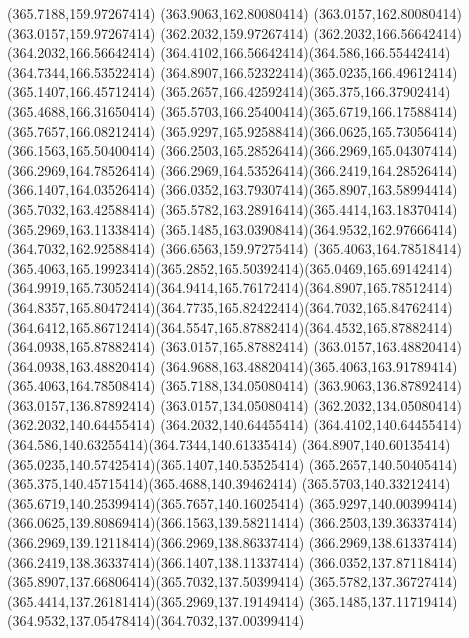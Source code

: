 {{	\closepath
	\moveto(365.7188,159.97267414)
	\lineto(363.9063,162.80080414)
	\lineto(363.0157,162.80080414)
	\lineto(363.0157,159.97267414)
	\lineto(362.2032,159.97267414)
	\lineto(362.2032,166.56642414)
	\lineto(364.2032,166.56642414)
	\curveto(364.4102,166.56642414)(364.586,166.55442414)(364.7344,166.53522414)
	\curveto(364.8907,166.52322414)(365.0235,166.49612414)(365.1407,166.45712414)
	\curveto(365.2657,166.42592414)(365.375,166.37902414)(365.4688,166.31650414)
	\curveto(365.5703,166.25400414)(365.6719,166.17588414)(365.7657,166.08212414)
	\curveto(365.9297,165.92588414)(366.0625,165.73056414)(366.1563,165.50400414)
	\curveto(366.2503,165.28526414)(366.2969,165.04307414)(366.2969,164.78526414)
	\curveto(366.2969,164.53526414)(366.2419,164.28526414)(366.1407,164.03526414)
	\curveto(366.0352,163.79307414)(365.8907,163.58994414)(365.7032,163.42588414)
	\curveto(365.5782,163.28916414)(365.4414,163.18370414)(365.2969,163.11338414)
	\curveto(365.1485,163.03908414)(364.9532,162.97666414)(364.7032,162.92588414)
	\lineto(366.6563,159.97275414)
	\closepath
	\moveto(365.4063,164.78518414)
	\curveto(365.4063,165.19923414)(365.2852,165.50392414)(365.0469,165.69142414)
	\curveto(364.9919,165.73052414)(364.9414,165.76172414)(364.8907,165.78512414)
	\curveto(364.8357,165.80472414)(364.7735,165.82422414)(364.7032,165.84762414)
	\curveto(364.6412,165.86712414)(364.5547,165.87882414)(364.4532,165.87882414)
	\lineto(364.0938,165.87882414)
	\lineto(363.0157,165.87882414)
	\lineto(363.0157,163.48820414)
	\lineto(364.0938,163.48820414)
	\curveto(364.9688,163.48820414)(365.4063,163.91789414)(365.4063,164.78508414)
	\closepath
	\moveto(365.7188,134.05080414)
	\lineto(363.9063,136.87892414)
	\lineto(363.0157,136.87892414)
	\lineto(363.0157,134.05080414)
	\lineto(362.2032,134.05080414)
	\lineto(362.2032,140.64455414)
	\lineto(364.2032,140.64455414)
	\curveto(364.4102,140.64455414)(364.586,140.63255414)(364.7344,140.61335414)
	\curveto(364.8907,140.60135414)(365.0235,140.57425414)(365.1407,140.53525414)
	\curveto(365.2657,140.50405414)(365.375,140.45715414)(365.4688,140.39462414)
	\curveto(365.5703,140.33212414)(365.6719,140.25399414)(365.7657,140.16025414)
	\curveto(365.9297,140.00399414)(366.0625,139.80869414)(366.1563,139.58211414)
	\curveto(366.2503,139.36337414)(366.2969,139.12118414)(366.2969,138.86337414)
	\curveto(366.2969,138.61337414)(366.2419,138.36337414)(366.1407,138.11337414)
	\curveto(366.0352,137.87118414)(365.8907,137.66806414)(365.7032,137.50399414)
	\curveto(365.5782,137.36727414)(365.4414,137.26181414)(365.2969,137.19149414)
	\curveto(365.1485,137.11719414)(364.9532,137.05478414)(364.7032,137.00399414)
}}
